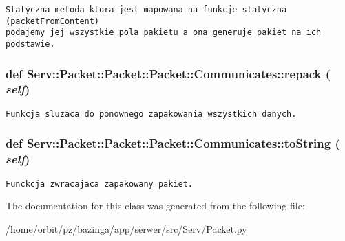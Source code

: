 \footnotesize\begin{verbatim}Statyczna metoda ktora jest mapowana na funkcje statyczna (packetFromContent)
podajemy jej wszystkie pola pakietu a ona generuje pakiet na ich podstawie.
\end{verbatim}
\normalsize
 \hypertarget{class_serv_1_1_packet_1_1_packet_1_1_communicates_13619dd95f08e357d87ced2085312096}{
\subsubsection[{repack}]{\setlength{\rightskip}{0pt plus 5cm}def Serv::Packet::Packet::Packet::Communicates::repack ( {\em self})}}
\label{class_serv_1_1_packet_1_1_packet_1_1_communicates_13619dd95f08e357d87ced2085312096}




\footnotesize\begin{verbatim}Funkcja sluzaca do ponownego zapakowania wszystkich danych.\end{verbatim}
\normalsize
 \hypertarget{class_serv_1_1_packet_1_1_packet_1_1_communicates_67b541eba588d3eab311c64dc5575c3b}{
\subsubsection[{toString}]{\setlength{\rightskip}{0pt plus 5cm}def Serv::Packet::Packet::Packet::Communicates::toString ( {\em self})}}
\label{class_serv_1_1_packet_1_1_packet_1_1_communicates_67b541eba588d3eab311c64dc5575c3b}




\footnotesize\begin{verbatim}Funckcja zwracajaca zapakowany pakiet.\end{verbatim}
\normalsize
 

The documentation for this class was generated from the following file:\begin{CompactItemize}
\item 
/home/orbit/pz/bazinga/app/serwer/src/Serv/Packet.py\end{CompactItemize}
